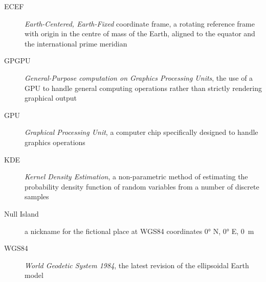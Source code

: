 \begin{description}
    \item[ECEF]
        \emph{Earth-Centered, Earth-Fixed} coordinate frame, a rotating reference frame with origin
        in the centre of mass of the Earth, aligned to the equator and the international prime meridian \cite{ecef}
    \item[GPGPU]
        \emph{General-Purpose computation on Graphics Processing Units},
        the use of a GPU to handle general computing operations rather than strictly rendering graphical output \cite{gpgpu}
    \item[GPU]
        \emph{Graphical Processing Unit}, a computer chip specifically designed to handle graphics operations \cite{gpu}
    \item[KDE]
        \emph{Kernel Density Estimation}, a non-parametric method of estimating the probability density function
        of random variables from a number of discrete samples \cite{kde}
    \item[Null Island]
        a nickname for the fictional place at WGS84 coordinates \ang{0} N, \ang{0} E, \SI{0}{\metre} \cite{null-island}
    \item[WGS84]
        \emph{World Geodetic System 1984}, the latest revision of the ellipsoidal Earth model
\end{description}
